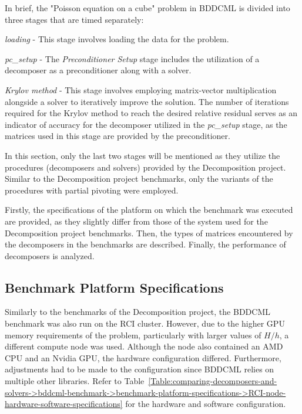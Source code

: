 In brief, the "Poisson equation on a cube" problem in BDDCML is divided into three stages that are timed separately\label{Text:comparing-decomposers-and-solvers->bddcml-benchmark->poisson-on-cube-stages}:

\begin{tight_enumerate}
	\item \textit{loading} - This stage involves loading the data for the problem.
	\item \textit{pc\_setup} - The \textit{Preconditioner Setup} stage includes the utilization of a decomposer as a preconditioner along with a solver.
	\item \textit{Krylov method} - This stage involves employing matrix-vector multiplication alongside a solver to iteratively improve the solution.
The number of iterations required for the Krylov method to reach the desired relative residual serves as an indicator of accuracy for the decomposer utilized in the \textit{pc\_setup} stage, as the matrices used in this stage are provided by the preconditioner.
\end{tight_enumerate}

In this section, only the last two stages will be mentioned as they utilize the procedures (decomposers and solvers) provided by the Decomposition project.
Similar to the Decomposition project benchmarks, only the variants of the procedures with partial pivoting were employed.

Firstly, the specifications of the platform on which the benchmark was executed are provided, as they slightly differ from those of the system used for the Decomposition project benchmarks.
Then, the types of matrices encountered by the decomposers in the benchmarks are described.
Finally, the performance of decomposers is analyzed.

\subsection{Benchmark Platform Specifications}\label{Subsection:comparing-decomposers-and-solvers->bddcml-benchmark->benchmark-platform-specifications}
Similarly to the benchmarks of the Decomposition project, the BDDCML benchmark was also run on the RCI cluster.
However, due to the higher GPU memory requirements of the problem, particularly with larger values of $H/h$, a different compute node was used.
Although the node also contained an AMD CPU and an Nvidia GPU, the hardware configuration differed.
Furthermore, adjustments had to be made to the configuration since BDDCML relies on multiple other libraries.
Refer to Table~\ref{Table:comparing-decomposers-and-solvers->bddcml-benchmark->benchmark-platform-specifications->RCI-node-hardware-software-specifications} for the hardware and software configuration.

